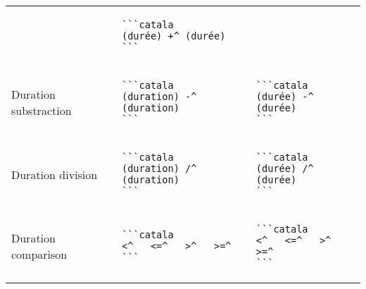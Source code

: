 \documentclass[a3paper,landscape]{article}
\begin{document}
\begin{multicols*}{2}
\begin{center}
\begin{tabular}{p{}p{}p{}}
                                      &
      \vspace*{-1.75em}
      \begin{verbatim}
```catala
(durée) +^ (durée)
```
\end{verbatim}
      \vspace*{-1.75em}
      \\
      Duration substraction           &
      \vspace*{-1.75em}
      \begin{verbatim}
```catala
(duration) -^ (duration)
```
\end{verbatim}
      \vspace*{-1.75em}
                                      &
      \vspace*{-1.75em}
      \begin{verbatim}
```catala
(durée) -^ (durée)
```
\end{verbatim}
      \vspace*{-1.75em}
      \\
      Duration division               &
      \vspace*{-1.75em}
      \begin{verbatim}
```catala
(duration) /^ (duration)
```
\end{verbatim}
      \vspace*{-1.75em}
                                      &
      \vspace*{-1.75em}
      \begin{verbatim}
```catala
(durée) /^ (durée)
```
\end{verbatim}
      \vspace*{-1.75em}
      \\
      Duration comparison             &
      \vspace*{-1.75em}
      \begin{verbatim}
```catala
<^   <=^   >^   >=^
```
\end{verbatim}
      \vspace*{-1.75em}
                                      &
      \vspace*{-1.75em}
      \begin{verbatim}
```catala
<^   <=^   >^   >=^
```
\end{verbatim}
      \vspace*{-1.75em}
      \\
      \bottomrule
    \end{tabular}
  \end{center}



\end{multicols*}
\end{document}
